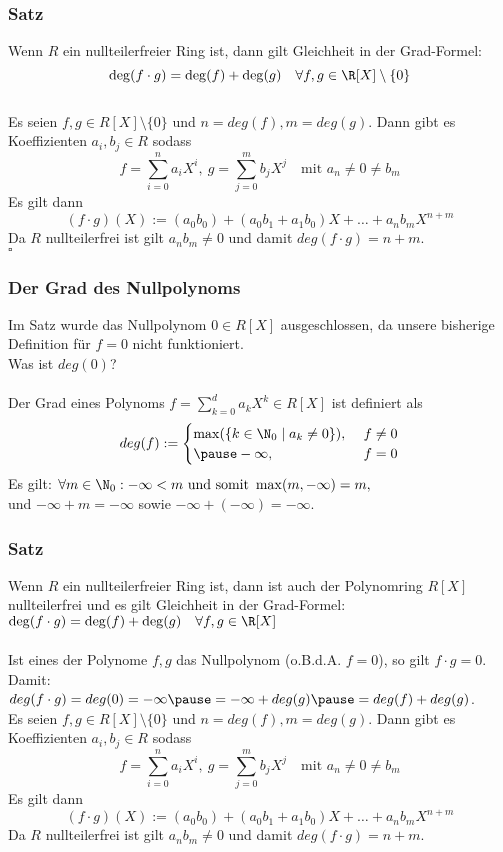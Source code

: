 \begin{frame}\frametitle{Satz}
Wenn $R$ ein nullteilerfreier Ring ist, dann 
gilt Gleichheit in der Grad-Formel:
$$
\deg(f\cdot g) = \deg(f) +\deg(g) \quad \forall f,g \in \R[X] \setminus \{0\}
$$\pause
\vfill
{}\\
Es seien $f,g \in R[X]\setminus \{0\}$ und $n=deg(f), m=deg(g)$. Dann gibt es Koeffizienten $a_i,b_j \in R$ sodass
$$
f=\sum_{i=0}^n a_iX^i , \ g=\sum_{j=0}^m b_jX^j \quad \text{mit } a_n\ne0\ne b_m
$$\pause
Es gilt dann
	$$
	(f \cdot g)(X) :=	(a_0  b_0) + (a_0 b_1+ a_1 b_0)X +\ldots +a_n b_m X^{n+m}
	$$ \pause
Da $R$ nullteilerfrei ist gilt $a_nb_m \ne 0$ und damit $deg(f\cdot g)=n+m$.\\
\hfill $\square$
\end{frame}
%
\begin{frame}\frametitle{Der Grad des Nullpolynoms}
Im Satz wurde das Nullpolynom $0 \in R[X]$ ausgeschlossen, da unsere bisherige Definition für $f=0$ nicht funktioniert.\\\pause
\vfill
Was ist $deg(0)$?\pause\\
\vfill
{}\\
Der Grad eines Polynoms $f=\sum_{k=0}^d a_kX^k \in R[X]$ ist definiert als
$$
deg(f):=\begin{cases} \max(\{k \in \N_0 \mid a_k\ne 0\}), \ & f\ne 0 \\\pause
						- \infty, & f=0 \end{cases}
$$\pause 
\vfill
Es gilt: $\forall m \in \N_0:  -\infty < m \text{ und somit } \max(m,-\infty)=m,$\\ \hspace{11mm} und $ -\infty+m=-\infty$ sowie $-\infty + (-\infty)=-\infty$.

\end{frame}
%
\begin{frame}\frametitle{Satz}
Wenn $R$ ein nullteilerfreier Ring ist, dann 
ist auch der Polynomring $R[X]$ nullteilerfrei und es 
gilt Gleichheit in der Grad-Formel:
\vspace{2mm}
$
\deg(f\cdot g) = \deg(f) +\deg(g) \quad \forall f,g \in \R[X] 
$\pause\\
\vspace{2mm}
\\
Ist eines der Polynome $f,g$ das Nullpolynom (o.B.d.A. $f=0$), so gilt $f\cdot g=0$. \pause Damit: $deg(f\cdot g)=deg(0)=-\infty\pause=-\infty + deg(g)\pause=deg(f)+deg(g)$.\\\pause
Es seien $f,g \in R[X]\setminus \{0\}$ und $n=deg(f), m=deg(g)$. Dann gibt es Koeffizienten $a_i,b_j \in R$ sodass
$$
f=\sum_{i=0}^n a_iX^i , \ g=\sum_{j=0}^m b_jX^j \quad \text{mit } a_n\ne0\ne b_m
$$\pause
Es gilt dann
	$$
	(f \cdot g)(X) :=	(a_0  b_0) + (a_0 b_1+ a_1 b_0)X +\ldots +a_n b_m X^{n+m}
	$$ \pause
Da $R$ nullteilerfrei ist gilt $a_nb_m \ne 0$ und damit $deg(f\cdot g)=n+m$.
\end{frame}
